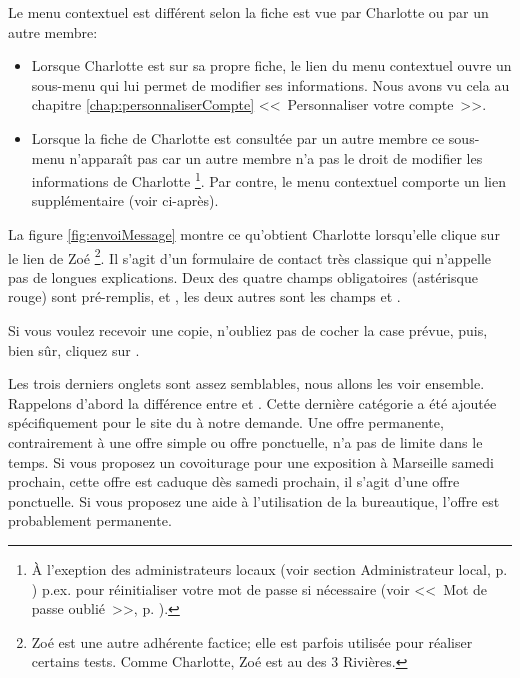 Le menu contextuel est différent selon la fiche est vue par Charlotte ou par un autre membre:
\begin{itemize}
    \item Lorsque Charlotte est sur sa propre fiche, le lien  du menu contextuel ouvre un sous-menu qui lui permet de modifier ses informations. Nous avons vu cela au chapitre \ref{chap:personnaliserCompte} <<~Personnaliser votre compte~>>.
    \item Lorsque la fiche de Charlotte est consultée par un autre membre ce sous-menu n'apparaît pas car un autre membre n'a pas le droit de modifier les informations de Charlotte%
    \footnote{À l'exeption des administrateurs locaux (voir section \og{}Administrateur local\fg{}, p. \pageref{sec:adminLocal}) p.ex. pour réinitialiser votre mot de passe si nécessaire (voir <<~Mot de passe oublié~>>, p. \pageref{sec:mdpOublie}).}.
    Par contre, le menu contextuel comporte un lien  supplémentaire (voir ci-après).
\end{itemize}

\label{page:envoyerCourrielMembre}

La figure \ref{fig:envoiMessage}  montre ce qu’obtient Charlotte lorsqu’elle clique sur le lien  de Zoé%
\footnote{Zoé est une autre adhérente factice; elle est parfois utilisée pour réaliser certains tests. Comme Charlotte, Zoé est  au \sel{} des 3 Rivières.}.
Il s’agit d’un formulaire de contact très classique qui n’appelle pas de longues explications. Deux des quatre champs obligatoires (astérisque rouge) sont pré-remplis,  et , les deux autres sont les champs  et .

Si vous voulez recevoir une copie, n'oubliez pas de cocher la case prévue, puis, bien sûr, cliquez sur .
 


Les trois derniers onglets sont assez semblables, nous allons les voir ensemble.
\label{page:typesOffres}Rappelons d’abord la différence entre  et . Cette dernière catégorie a été ajoutée spécifiquement pour le site du \CdS{} à notre demande. Une offre permanente, contrairement à une offre simple ou offre ponctuelle, n’a pas de limite dans le temps. Si vous proposez un covoiturage pour une exposition à Marseille samedi prochain, cette offre est caduque dès samedi prochain, il s’agit d’une offre ponctuelle. Si vous proposez une aide à l’utilisation de la bureautique, l’offre est probablement permanente.

